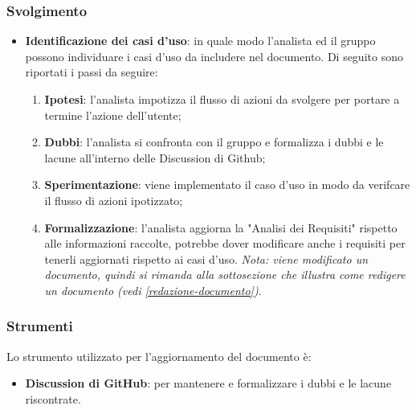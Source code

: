 \subsubsection{Svolgimento}
\begin{itemize}
	\item \textbf{Identificazione dei casi d'uso}: in quale modo l'analista ed
	      il gruppo possono individuare i casi d'uso da includere nel documento.
	      Di seguito sono riportati i passi da seguire:
	      \begin{enumerate}
		      \item \textbf{Ipotesi}: l'analista impotizza il flusso di azioni
		            da svolgere per portare a termine l'azione dell'utente;

		      \item \textbf{Dubbi}: l'analista si confronta con il gruppo e
		            formalizza i dubbi e le lacune all'interno delle Discussion di
		            Github\g;

		      \item \textbf{Sperimentazione}: viene implementato il caso d'uso
		            in modo da verifcare il flusso di azioni ipotizzato;

		      \item \textbf{Formalizzazione}: l'analista aggiorna la "Analisi
		            dei Requisiti" rispetto alle informazioni raccolte, potrebbe
		            dover modificare anche i requisiti per tenerli aggiornati
		            rispetto ai casi d'uso. \textit{Nota: viene modificato un
			            documento, quindi si rimanda alla sottosezione che
			            illustra come redigere un documento (vedi
			            \cref{redazione-documento})}.
	      \end{enumerate}
\end{itemize}

\subsubsection{Strumenti}
Lo strumento utilizzato per l'aggiornamento del documento è:
\begin{itemize}
	\item \textbf{Discussion di GitHub\g}: per mantenere e formalizzare i dubbi
	      e le lacune riscontrate.
\end{itemize}
